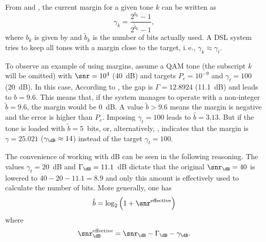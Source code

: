 From  and , the current margin for a given tone $k$ can be written as
\begin{equation}
\gamma_k = \frac{2^{b_k}-1}{2^{\tilde b_k}-1},
\label{eq:margin_explicit2}
\end{equation}
where $b_k$ is given by  and $\tilde b_k$ is the 
number of bits actually used.
A DSL system tries to keep all tones with a margin close to the target, i.\,e., $\gamma_k \approx \gamma_t$.


To observe an example of using margins, assume a QAM tone (the subscript $k$ will be omitted) with $\snr = 10^4$ (40~dB) and targets $P_e=10^{-9}$ and $\gamma_t = 100$ (20~dB). 
\ifdefined\akAmazonBook
In this case,
\else
According to , 
\fi
the gap is $\Gamma=12.8924$ (11.1~dB) and  leads to $b = 9.6$. This means that, if the system manages to operate with a non-integer $\tilde b = 9.6$, the margin would be 0~dB. A value $\tilde b > 9.6$ means the margin is negative and the error is higher than $P_e$. Imposing $\gamma_t = 100$ leads to $\hat b = 3.13$.
But if the tone is loaded with $\tilde b = 5$~bits,  or, alternatively, , indicates that the margin is $\gamma = 25.021$ ($\gamma_{\dB} \approx 14$) instead of the target $\gamma_t = 100$.

The convenience of working with dB can be seen in the following reasoning. The values $\gamma_t=20$~dB and $\Gamma_{\dB}=11.1$~dB dictate that the original $\snr_{\dB}=40$ is lowered to $40 - 20 - 11.1 = 8.9$ and only this amount is effectively used to calculate the number of bits. More generally, one has
\begin{equation}
\hat b = \log_2 \left( 1+ \snr^{\textrm{effective}} \right)
\end{equation}
where 
\begin{equation}
\snr_{\dB}^{\textrm{effective}} = \snr_{\dB} - \Gamma_{\dB} - \gamma_{\dB}.
\end{equation}


